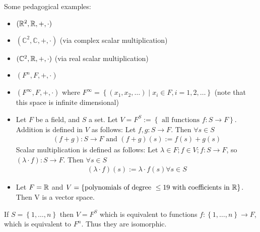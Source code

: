 \documentclass{memoir}
\begin{document}
\begin{exmp}
Some pedagogical examples:
	\begin{itemize}
\item $(\mathbb{R}^2,\mathbb{R},+,\cdot)$
\item $(\mathbb{C}^2, \mathbb{C}, +, \cdot)$ (via complex scalar multiplication)
\item $(\mathbb{C}^2,\mathbb{R},+,\cdot)$ (via real scalar multiplication)
\item $(F^{n}, F, +, \cdot )$
\item $(F^{\infty}, F, +, \cdot )$ where $F^{\infty} = \left\{ (x_1,x_2,\ldots) \mid x_i \in F, i=1,2,\ldots \right\}$ (note that this space is infinite dimensional)
\item Let $F$ be a field, and $S$ a set. Let $V = F^{S} := \left\{ \text{ all functions } f:S\to F \right\} $. Addition is defined in $V$ as follows: Let  $f,g:S\to F$. Then $\forall  s \in S$
	\begin{align*}
		(f+g): S\to F \text{ and } (f+g)(s) := f(s)+g(s)
	\end{align*}
	Scalar multiplication is defined as follows: Let $\lambda \in F; f\in V; f:S\to F$, so $(\lambda \cdot f):S\to F$. Then $\forall s \in S$
	\begin{align*}
	(\lambda \cdot f)(s) := \lambda \cdot f(s) \forall s\in S
\end{align*}
	\item  Let $F = \mathbb{R}$ and $V = \left\{  \text{polynomials of degree }\leq 19 \text{ with coefficients in }\mathbb{R}  \right\} $.
Then V is a vector space.
	\end{itemize}

\end{exmp}

\begin{rmrk}
	
If $S = \left\{ 1,\ldots,n \right\} $ then $V = F^{S}$ which is equivalent to functions $f:\left\{ 1,\ldots,n \right\} \to F$, which is equivalent to $F^{n}$. Thus they are isomorphic.
\end{rmrk}

\end{document}
